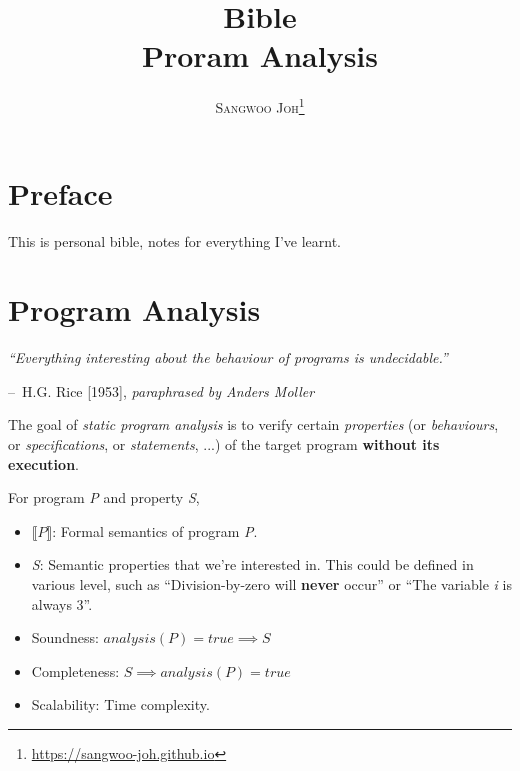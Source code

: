 \documentclass[12pt, twopage]{book}
\title{
  \Huge \textbf{Bible}
  \\
  \huge {Proram Analysis}
}
\author{\textsc{Sangwoo Joh}\footnote{\url{https://sangwoo-joh.github.io}}}
\makeatletter
\newenvironment{chapquote}[2][2em]
{\setlength{\@tempdima}{#1}%
  \def\chapquote@author{#2}%
  \parshape 1 \@tempdima \dimexpr\textwidth-2\@tempdima\relax%
  \itshape}
{\par\normalfont\hfill--\ \chapquote@author\hspace*{\@tempdima}\par\bigskip}
\makeatother
\begin{document}
\frontmatter
\maketitle

\tableofcontents  %
\listoffigures  %
\listoftables   %

\mainmatter


\chapter*{Preface}
This is personal bible, notes for everything I've learnt.


\chapter{Program Analysis}
\begin{chapquote}{H.G. Rice [1953], \textit{paraphrased by Anders Moller}}
  ``Everything interesting about the behaviour of programs is
  undecidable.''
\end{chapquote}

The goal of \textit{static program analysis} is to verify certain
\textsl{properties} (or \textsl{behaviours}, or
\textsl{specifications}, or \textsl{statements}, ...) of the target
program \textbf{without its execution}.

For program \textsl{P} and property \textsl{S},

\begin{itemize}
\item $ \llbracket P \rrbracket $: Formal semantics of program \textsl{P}.

\item \textsl{S}: Semantic properties that we're interested in. This
  could be defined in various level, such as ``Division-by-zero will
  \textbf{never} occur'' or ``The variable \textit{i} is always 3''.

\item Soundness: $ analysis(P) = true \implies S $

\item Completeness: $ S \implies analysis(P) = true $

\item Scalability: Time complexity.
\end{itemize}
\end{document}
